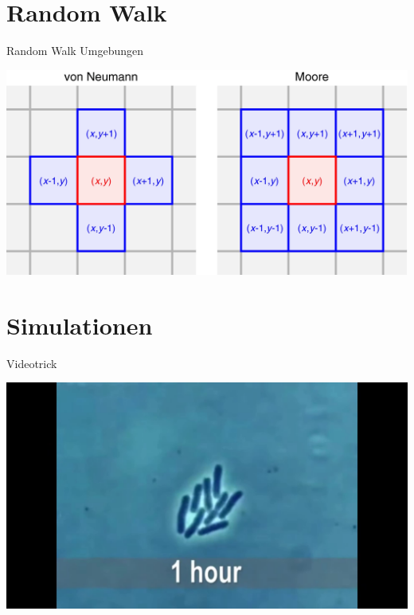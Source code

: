 \documentclass[xcolor=dvipsnames, aspectratio=169]{beamer}
\begin{document}
%	

\section{Random Walk}
\begin{frame}[t]{Random Walk Umgebungen}
	\begin{center}
		\includegraphics[width=0.6\linewidth]{figures/CA_Umgebungen.png} 
	\end{center}
\end{frame}

\section{Simulationen}

\begin{frame}[t]{Videotrick}
\begin{center}
\includegraphics[width=0.6\linewidth]{bacteria_pushing/bacteria-pushing-01.jpeg} 
\end{center}
\end{frame}
\end{document}
